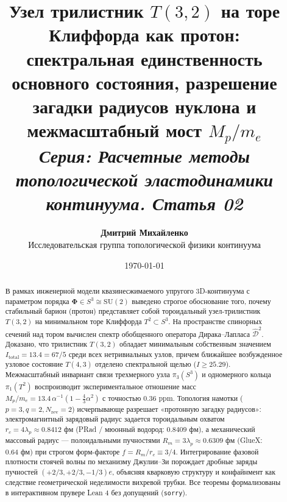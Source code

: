 \documentclass[11pt,a4paper]{article}
\theoremstyle{definition}
\theoremstyle{remark}
\begin{document}
\title{\textbf{\Large Узел трилистник $T(3,2)$ на торе Клиффорда как протон:}\\
\large спектральная единственность основного состояния, разрешение загадки радиусов нуклона и межмасштабный мост $M_p/m_e$\\[2mm]
\normalsize \textit{Серия: Расчетные методы топологической эластодинамики континуума. Статья 02}}

\author{\textbf{Дмитрий Михайленко}\\[1mm]
\small Исследовательская группа топологической физики континуума}

\date{\today}

\maketitle

\begin{abstract}
\noindent В рамках инженерной модели квазинесжимаемого упругого 3D-континуума с параметром порядка $\boldsymbol{\Phi} \in S^3 \cong \mathrm{SU}(2)$ выведено строгое обоснование того, почему стабильный барион (протон) представляет собой тороидальный узел-трилистник $T(3,2)$ на минимальном торе Клиффорда $T^2 \subset S^3$. На пространстве спинорных сечений над тором вычислен спектр обобщенного оператора Дирака--Лапласа $\hat{\mathcal{D}}^2$. Доказано, что трилистник $T(3,2)$ обладает минимальным собственным значением $I_{\mathrm{total}} = 13.4 = 67/5$ среди всех нетривиальных узлов, причем ближайшее возбужденное узловое состояние $T(4,3)$ отделено спектральной щелью ($I \ge 25.29$). Межмасштабный инвариант связи трехмерного узла $\pi_3(S^3)$ и одномерного кольца $\pi_1(T^2)$ воспроизводит экспериментальное отношение масс $M_p/m_e = 13.4 \, \alpha^{-1}(1 - \frac{4}{3}\alpha^2)$ с точностью $0.36\text{ ppm}$. Топология намотки ($p=3, q=2, N_{\mathrm{rev}}=2$) исчерпывающе разрешает «протонную загадку радиусов»: электромагнитный зарядовый радиус задается тороидальным охватом $r_c = 4\lambda_p \approx 0.8412\text{ фм}$ (PRad / мюонный водород: $0.8409\text{ фм}$), а механический массовый радиус — полоидальными пучностями $R_m = 3\lambda_p \approx 0.6309\text{ фм}$ (GlueX: $0.64\text{ фм}$) при строгом форм-факторе $f = R_m / r_c \equiv 3/4$. Интегрирование фазовой плотности стоячей волны по механизму Джулии--Зи порождает дробные заряды пучностей $(+2/3, +2/3, -1/3)e$, объясняя кварковую структуру и конфайнмент как следствие геометрической неделимости вихревой трубки. Все теоремы формализованы в интерактивном прувере Lean 4 без допущений (\texttt{sorry}).
\end{abstract}
\end{document}
